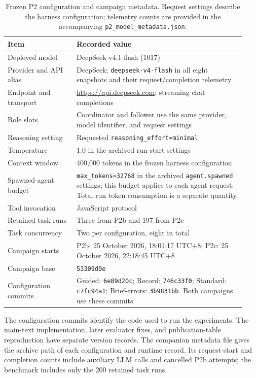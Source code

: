 \begin{table}[htbp]
\centering
\small
\caption{Frozen P2 configuration and campaign metadata. Request settings describe the harness configuration; telemetry counts are provided in the accompanying \texttt{p2\_model\_metadata.json}.}
\label{tab:si-p2-model-metadata}
\begin{tabular}{p{0.27\linewidth}p{0.66\linewidth}}
\toprule
Item & Recorded value \\
\midrule
Deployed model & DeepSeek-v4.1-flash (1017) \\
Provider and API alias & DeepSeek; \texttt{deepseek-v4-flash} in all eight snapshots and their request/completion telemetry \\
Endpoint and transport & \url{https://api.deepseek.com}; streaming chat completions \\
Role slots & Coordinator and follower use the same provider, model identifier, and request settings \\
Reasoning setting & Requested \texttt{reasoning\_effort=minimal} \\
Temperature & 1.0 in the archived run-start settings \\
Context window & 400,000 tokens in the frozen harness configuration \\
Spawned-agent budget & \texttt{max\_tokens=32768} in the archived \texttt{agent.spawned} settings; this budget applies to each agent request. Total run token consumption is a separate quantity. \\
Tool invocation & JavaScript protocol \\
Retained task runs & Three from P2b and 197 from P2c \\
Task concurrency & Two per configuration, eight in total \\
Campaign starts & P2b: 25 October 2026, 18:01:17 UTC+8; P2c: 25 October 2026, 22:18:45 UTC+8 \\
Campaign base & \texttt{53309d0e} \\
Configuration commits & Guided: \texttt{6e89d20c}; Record: \texttt{746c33f0}; Standard: \texttt{c7fc94a1}; Brief-errors: \texttt{3b9831bb}. Both campaigns use these commits. \\
\bottomrule
\end{tabular}
\end{table}

The configuration commits identify the code used to run the experiments. The main-text implementation, later evaluator fixes, and publication-table reproduction have separate version records. The companion metadata file gives the archive path of each configuration and runtime record. Its request-start and completion counts include auxiliary LLM calls and cancelled P2b attempts; the benchmark includes only the 200 retained task runs.

